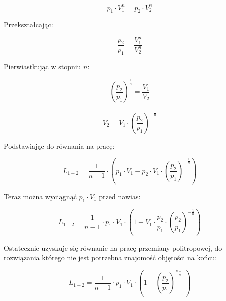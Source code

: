 \[ p_1 \cdot V_1 ^n = p_2 \cdot V_2 ^n \]

Przekształcając:

\[\frac{p_2}{p_1} = \frac{V_1 ^n}{V_2 ^n} \]

Pierwiastkując w stopniu $n$:

\[\left( \frac{p_2}{p_1} \right) ^{\frac{1}{n}} = \frac{V_1}{V_2} \]

\[V_2 = V_1 \cdot \left( \frac{p_2}{p_1} \right) ^{-\frac{1}{n}} \]

Podstawiając do równania na pracę:

\[L_{1-2} = \frac{1}{n-1} \cdot \left( p_1 \cdot V_1 - p_2 \cdot V_1 \cdot \left( \frac{p_2}{p_1} \right) ^{-\frac{1}{n}}  \right)\]

Teraz można wyciągnąć $p_1 \cdot V_1$ przed nawias:

\[L_{1-2} = \frac{1}{n-1} \cdot  p_1 \cdot V_1\cdot \left(1 - V_1 \cdot \frac{p_2}{p_1} \cdot  \left( \frac{p_2}{p_1} \right) ^{-\frac{1}{n}}  \right)\]

Ostatecznie uzyskuje się równanie na pracę przemiany politropowej, do rozwiązania którego nie jest potrzebna znajomość objętości na końcu:

\[L_{1-2} = \frac{1}{n-1} \cdot  p_1 \cdot V_1\cdot \left(1 - \left( \frac{p_2}{p_1} \right) ^{\frac{n-1}{n}}  \right)\]
